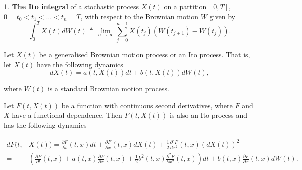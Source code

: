 \documentclass[british]{amsart} \usepackage{lmodern}
\numberwithin{equation}{section} \numberwithin{figure}{section}
\theoremstyle{plain} \newtheorem{thm}{\protect\theoremname}[section]
\theoremstyle{definition} \newtheorem{defn}[thm]{\protect\definitionname}
\theoremstyle{plain} \newtheorem{assumption}[thm]{\protect\assumptionname}
\theoremstyle{plain} \newtheorem{lem}[thm]{\protect\lemmaname}
\theoremstyle{plain} \newtheorem{prop}[thm]{\protect\propositionname}
\theoremstyle{remark} \newtheorem{rem}[thm]{\protect\remarkname}
\theoremstyle{plain} \newtheorem{cor}[thm]{\protect\corollaryname}
\begin{document}
%
\begin{defn}
\textbf{The Ito integral} of a stochastic process $X(t)$ on a partition
$[0,T]$, $0=t_{0}<t_{1}<\ldots<t_{n}=T$, with respect to the Brownian
motion $W$ given by
\[
\int_{0}^{T}X(t)dW(t)\triangleq\lim_{n\to\infty}\sum_{j=0}^{n-1}X(t_{j})\left(W(t_{j+1})-W(t_{j})\right).
\]
%
\end{defn}
Let $X(t)$ be a generalised Brownian motion process or an Ito process.
That is, let $X(t)$ have the following dynamics
%
\begin{equation}
dX(t)=a(t,X(t))dt+b(t,X(t))dW(t),
\end{equation}

where $W(t)$ is a standard Brownian motion process.

Let $F(t,X(t))$ be a function with continuous second derivatives,
where $F$ and $X$ have a functional dependence. Then $F(t,X(t))$
is also an Ito process and has the following dynamics

\begin{align*}
dF(t, & X(t))=\frac{\partial F}{\partial t}(t,x)dt+\frac{\partial F}{\partial x}(t,x)dX(t)+\frac{1}{2}\frac{\partial^{2}F}{dx^{2}}(t,x)(dX(t))^{2}\\
= & \left(\frac{\partial F}{\partial t}(t,x)+a(t,x)\frac{\partial F}{\partial x}(t,x)+\frac{1}{2}b^{2}(t,x)\frac{\partial^{2}F}{\partial x^{2}}(t,x)\right)dt+b(t,x)\frac{\partial F}{\partial x}(t,x)dW(t).\\
\end{align*}

\end{document}
